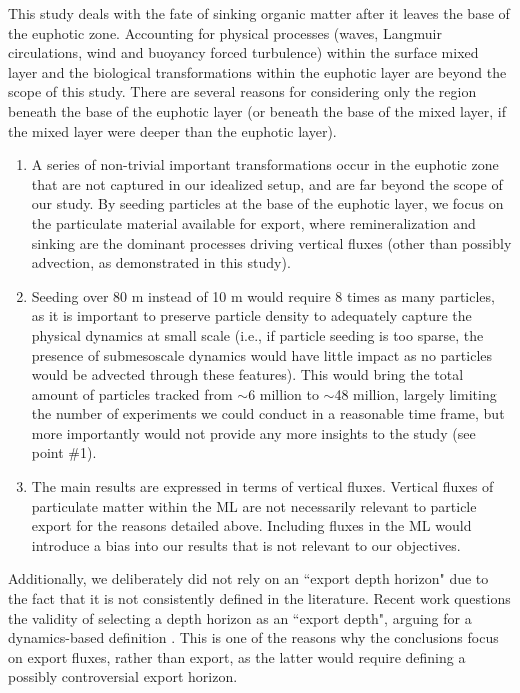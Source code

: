 \documentclass[12pt,letter]{article}
\begin{document}
{\color{blue}
This study deals with the fate of sinking organic matter after it leaves the base of the euphotic zone. Accounting for physical processes (waves, Langmuir circulations, wind and buoyancy forced turbulence) within the surface mixed layer and the biological transformations within the euphotic layer are beyond the scope of this study. There are several reasons for considering only the region beneath the base of the euphotic layer (or beneath the base of the mixed layer, if the mixed layer were deeper than the euphotic layer). %
			\begin{enumerate}
				\item A series of non-trivial important transformations occur in the euphotic zone \citep[e.g., grazing, materal packaging, aggregation, disaggregation, etc.; see][for example]{Denman_1999} that are not captured in our idealized setup, and are far beyond the scope of our study. By seeding particles at the base of the euphotic layer, we focus on the particulate material available for export, where remineralization and sinking are the dominant processes driving vertical fluxes (other than possibly advection, as demonstrated in this study).
				\item Seeding over 80 m instead of 10 m would require 8 times as many particles, as it is important to preserve particle density to adequately capture the physical dynamics at small scale (i.e., if particle seeding is too sparse, the presence of submesoscale dynamics would have little impact as no particles would be advected through these features). This would bring the total amount of particles tracked from $\sim$6 million to $\sim$48 million, largely limiting the number of experiments we could conduct in a reasonable time frame, but more importantly would not provide any more insights to the study (see point \#1).
				\item The main results are expressed in terms of vertical fluxes. Vertical fluxes of particulate matter within the ML are not necessarily relevant to particle export for the reasons detailed above. Including fluxes in the ML would introduce a bias into our results that is not relevant to our objectives.
			\end{enumerate}

Additionally, we deliberately did not rely on an ``export depth horizon" due to the fact that it is not consistently defined in the literature. Recent work questions the validity of selecting a depth horizon as an ``export depth", arguing for a dynamics-based definition \citep{Palevsky_2018, buesseler2020metrics}. This is one of the reasons why the conclusions focus on export fluxes, rather than export, as the latter would require defining a possibly controversial export horizon.\\

}
\end{document}
